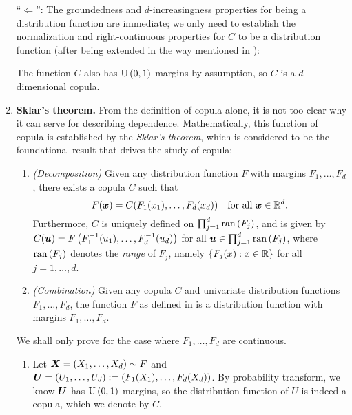 \begin{enumerate}
\begin{pf}
``\(\Leftarrow\)'': The groundedness and \(d\)-increasingness properties for
being a distribution function are immediate; we only need to establish the
normalization and right-continuous properties for \(C\) to be a distribution
function (after being extended in the way mentioned in ):
The function \(C\) also has \(\operatorname{U}\left(0,1\right)\) margins by assumption, so \(C\) is
a \(d\)-dimensional copula.
\end{pf}
\item \textbf{Sklar's theorem.} From the definition of copula alone, it is not
too clear why it can serve for describing dependence. Mathematically, this
function of copula is established by the \emph{Sklar's theorem}, which is
considered to be the foundational result that drives the study of copula:
\begin{theorem}
\label{thm:sklar}
\hfill
\begin{enumerate}
\item \emph{(Decomposition)} Given any distribution function \(F\) with margins \(F_1,\dotsc,F_d\),
there exists a copula \(C\) such that
\begin{equation}
\label{eq:copula-link}
F(\bm{x})=C(F_1(x_1),\dotsc,F_d(x_d))\quad\text{for all \(\bm{x}\in\mathbb{R}^d\)}.
\end{equation}
Furthermore, \(C\) is uniquely defined on \(\prod_{j=1}^{d}\operatorname{ran}\left(F_j\right)\), and is
given by \(C(\bm{u})=F\left(F_1^{-1}(u_1),\dotsc,F_d^{-1}(u_d)\right)\) for all
\(\bm{u}\in\prod_{j=1}^{d}\operatorname{ran}\left(F_j\right)\), where \(\operatorname{ran}\left(F_j\right)\) denotes the
\emph{range} of \(F_j\), namely \(\{F_j(x):x\in\mathbb{R}\}\) for all \(j=1,\dotsc,d\).
\item \emph{(Combination)} Given any copula \(C\) and univariate distribution
functions \(F_1,\dotsc,F_d\), the function \(F\) as defined in
 is a distribution function with margins
\(F_1,\dotsc,F_d\).
\end{enumerate}
\end{theorem}
\begin{pf}
We shall only prove for the case where \(F_1,\dotsc,F_d\) are continuous.
\begin{enumerate}
\item Let \(\bm{X}=(X_1,\dotsc,X_d)\sim F\) and
\(\bm{U}=(U_1,\dotsc,U_d):=(F_1(X_1),\dotsc,F_d(X_d))\). By probability transform, we know
\(\bm{U}\) has \(\operatorname{U}\left(0,1\right)\) margins, so the distribution function of \(U\)
is indeed a copula, which we denote by \(C\).


\end{enumerate}
\end{pf}
\end{enumerate}
